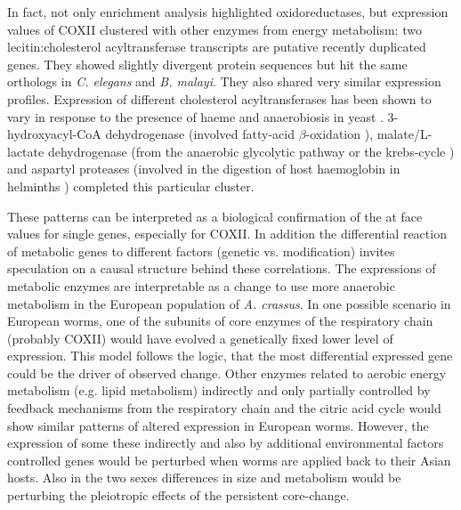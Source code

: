 In fact, not only enrichment analysis highlighted oxidoreductases, but
expression values of COXII clustered with other enzymes from energy
metabolism: two lecitin:cholesterol acyltransferase transcripts are
putative recently duplicated genes. They showed slightly divergent
protein sequences but hit the same orthologs in \textit{C. elegans}
and \textit{B. malayi}. They also shared very similar expression
profiles. Expression of different cholesterol acyltransferases has
been shown to vary in response to the presence of haeme and
anaerobiosis in yeast \cite{pmid11786267}. 3-hydroxyacyl-CoA
dehydrogenase (involved fatty-acid $\beta$-oxidation
\cite{pmid8454629}), malate/L-lactate dehydrogenase (from the
anaerobic glycolytic pathway or the krebs-cycle
\cite{sturm1969vergleichende}) and aspartyl proteases (involved in the
digestion of host haemoglobin in helminths \cite{pmid12782060})
completed this particular cluster.

These patterns can be interpreted as a biological confirmation of the
at face values for single genes, especially for COXII. In addition the
differential reaction of metabolic genes to different factors (genetic
vs. modification) invites speculation on a causal structure behind
these correlations. The expressions of metabolic enzymes are
interpretable as a change to use more anaerobic metabolism in the
European population of \textit{A. crassus}. In one possible scenario
in European worms, one of the subunits of core enzymes of the
respiratory chain (probably COXII) would have evolved a genetically
fixed lower level of expression. This model follows the logic, that
the most differential expressed gene could be the driver of observed
change. Other enzymes related to aerobic energy metabolism (e.g. lipid
metabolism) indirectly and only partially controlled by feedback
mechanisms from the respiratory chain and the citric acid cycle would
show similar patterns of altered expression in European
worms. However, the expression of some these indirectly and also by
additional environmental factors controlled genes would be perturbed
when worms are applied back to their Asian hosts. Also in the two
sexes differences in size and metabolism would be perturbing the
pleiotropic effects of the persistent core-change.


